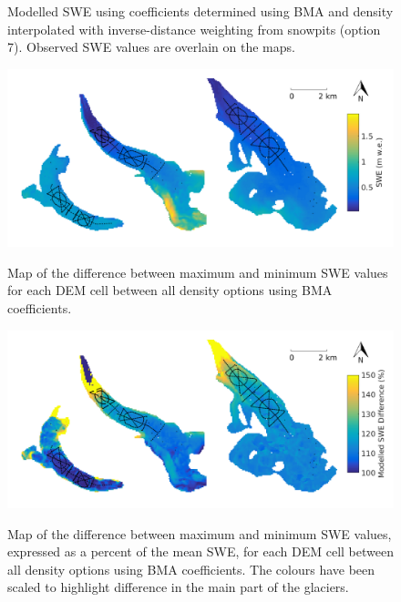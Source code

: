 \documentclass[12pt]{article}
\begin{document}
\begin{figure}[H]
	\caption{Modelled SWE using coefficients determined using BMA and density interpolated with inverse-distance weighting from snowpits (option 7). Observed SWE values are overlain on the maps.}
	\label{fig:BMSmodelledSWE}
\end{figure}
 
\begin{figure}[H]
	\centering
	\includegraphics[width =\textwidth]{BMS_SWEdifferenceMap.png}\\
	\caption{Map of the difference between maximum and minimum SWE values for each DEM cell between all density options using BMA coefficients.}
	\label{fig:BMS_SWEdiffMap}
\end{figure} 
 
 \begin{figure}[H]
	\centering
	\includegraphics[width =\textwidth]{BMS_SWEdifferenceMap_percent.png}\\
	\caption{Map of the difference between maximum and minimum SWE values, expressed as a percent of the mean SWE, for each DEM cell between all density options using BMA coefficients. The colours have been scaled to highlight difference in the main part of the glaciers.}
	\label{fig:BMS_SWEdiffMap}
\end{figure} 
\end{document}

